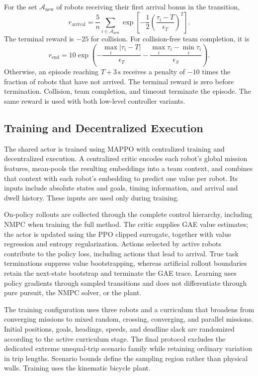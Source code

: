 For the set $\mathcal A_{\mathrm{new}}$ of robots receiving their first
arrival bonus in the transition,
\begin{equation}
    r_{\mathrm{arrival}}
    =\frac{5}{n}\sum_{i\in\mathcal A_{\mathrm{new}}}
       \exp\!\left[-\frac12\left(\frac{\tau_i-T}{\epsilon_T}\right)^2\right].
\end{equation}
The terminal reward is $-25$ for collision. For collision-free team completion,
it is
\begin{equation}
    r_{\mathrm{end}}=10\exp\!\left(
       -\frac{\max_i|\tau_i-T|}{\epsilon_T}
       -\frac{\max_i\tau_i-\min_i\tau_i}{\epsilon_S}\right).
\end{equation}
Otherwise, an episode reaching $T+3\,\mathrm{s}$ receives a penalty of
$-10$ times the fraction of robots that have not arrived. The terminal reward
is zero before termination. Collision, team completion, and timeout terminate
the episode. The same reward is used with both low-level controller variants.

\subsection{Training and Decentralized Execution}

The shared actor is trained using MAPPO with centralized training and
decentralized execution. A centralized critic encodes each robot's global
mission features, mean-pools the resulting embeddings into a team context,
and combines that context with each robot's embedding to predict one value
per robot. Its inputs include absolute states and goals, timing information,
and arrival and dwell history. These inputs are used only during training.

On-policy rollouts are collected through the complete control hierarchy,
including NMPC when training the full method. The critic supplies GAE value
estimates; the actor is updated using the PPO clipped surrogate, together
with value regression and entropy regularization. Actions selected by active
robots contribute to the policy loss, including actions that lead to arrival.
True task terminations suppress value bootstrapping, whereas artificial rollout
boundaries retain the next-state bootstrap and terminate the GAE trace.
Learning uses policy gradients through sampled transitions and does not
differentiate through pure pursuit, the NMPC solver, or the plant.

The training configuration uses three robots and a curriculum that broadens
from converging missions to mixed random, crossing, converging, and parallel
missions. Initial positions, goals, headings, speeds, and deadline slack are
randomized according to the active curriculum stage. The final protocol
excludes the dedicated extreme unequal-trip scenario family while retaining
ordinary variation in trip lengths. Scenario bounds define the sampling
region rather than physical walls. Training uses the kinematic bicycle plant.

